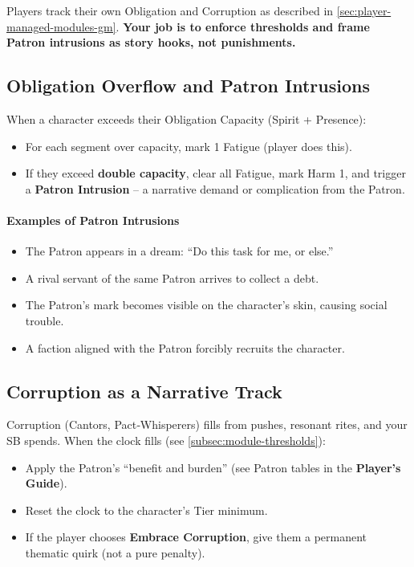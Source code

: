 Players track their own Obligation and Corruption as described in \ref{sec:player-managed-modules-gm}. \textbf{Your job is to enforce thresholds and frame Patron intrusions as story hooks, not punishments.}

\subsection*{Obligation Overflow and Patron Intrusions}
When a character exceeds their Obligation Capacity (Spirit + Presence):
\begin{itemize}
  \item For each segment over capacity, mark 1 Fatigue (player does this).
  \item If they exceed \textbf{double capacity}, clear all Fatigue, mark Harm 1, and trigger a \textbf{Patron Intrusion} – a narrative demand or complication from the Patron.
\end{itemize}

\paragraph{Examples of Patron Intrusions}
\begin{itemize}
  \item The Patron appears in a dream: ``Do this task for me, or else.''
  \item A rival servant of the same Patron arrives to collect a debt.
  \item The Patron’s mark becomes visible on the character’s skin, causing social trouble.
  \item A faction aligned with the Patron forcibly recruits the character.
\end{itemize}

\subsection*{Corruption as a Narrative Track}
Corruption (Cantors, Pact‑Whisperers) fills from pushes, resonant rites, and your SB spends. When the clock fills (see \ref{subsec:module-thresholds}):
\begin{itemize}
  \item Apply the Patron’s ``benefit and burden'' (see Patron tables in the \textbf{Player's Guide}).
  \item Reset the clock to the character’s Tier minimum.
  \item If the player chooses \textbf{Embrace Corruption}, give them a permanent thematic quirk (not a pure penalty).
\end{itemize}

